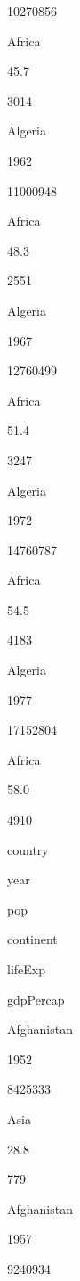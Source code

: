 \documentclass[]{book}
\newenvironment{Shaded}{\begin{snugshade}}{\end{snugshade}}
\newcommand{\CommentTok}[1]{\textcolor[rgb]{0.56,0.35,0.01}{\textit{#1}}}
\newcommand{\KeywordTok}[1]{\textcolor[rgb]{0.13,0.29,0.53}{\textbf{#1}}}
\newcommand{\NormalTok}[1]{#1}
\newcommand{\OperatorTok}[1]{\textcolor[rgb]{0.81,0.36,0.00}{\textbf{#1}}}
\newcommand{\StringTok}[1]{\textcolor[rgb]{0.31,0.60,0.02}{#1}}
\begin{document}
10270856

Africa

45.7

3014

Algeria

1962

11000948

Africa

48.3

2551

Algeria

1967

12760499

Africa

51.4

3247

Algeria

1972

14760787

Africa

54.5

4183

Algeria

1977

17152804

Africa

58.0

4910

\begin{Shaded}
\end{Shaded}

country

year

pop

continent

lifeExp

gdpPercap

Afghanistan

1952

8425333

Asia

28.8

779

Afghanistan

1957

9240934
\end{document}
